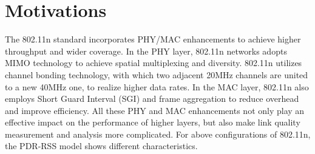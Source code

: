 \documentclass[draftclsnofoot,journal,onecolumn,11pt]{IEEEtran}
\begin{document}
%
%
%
%
%
%

\section{Motivations}

The 802.11n standard incorporates PHY/MAC enhancements to achieve higher throughput and wider coverage. In the PHY layer, 802.11n networks adopts MIMO technology to achieve spatial multiplexing and diversity. 802.11n utilizes channel bonding technology, with which two adjacent 20MHz channels are united to a new 40MHz one, to realize higher data rates. In the MAC layer, 802.11n also employs Short Guard Interval (SGI) and frame aggregation to reduce overhead and improve efficiency. All these PHY and MAC enhancements not only play an effective impact on the performance of higher layers, but also make link quality measurement and analysis more complicated. For above configurations of 802.11n, the PDR-RSS model shows different characteristics.

\end{document}
